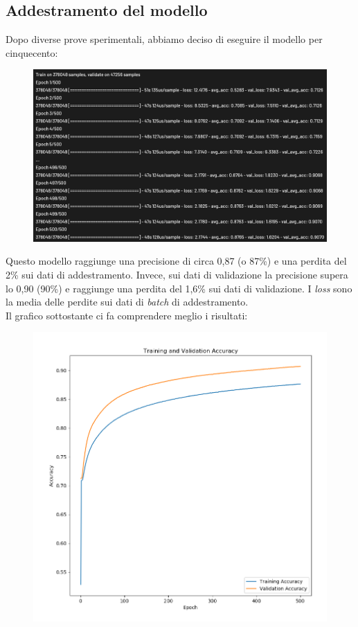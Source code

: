 \subsection{Addestramento del modello}
Dopo diverse prove sperimentali, abbiamo deciso di eseguire il modello per cinquecento:
\begin{figure}[H]
	\centering
	\includegraphics[scale=0.8]{./images/storia.png}
\end{figure}
Questo modello raggiunge una precisione di circa 0,87 (o 87\%) e una perdita del 2\% sui dati di addestramento. Invece, sui dati di validazione la precisione supera lo 0,90 (90\%) e raggiunge una perdita del 1,6\% sui dati di validazione. I \textit{loss} sono la media delle perdite sui dati di \textit{batch} di addestramento.\\
\newline
Il grafico sottostante ci fa comprendere meglio i risultati:
\begin{figure}[H]
	\centering
	\includegraphics[scale=0.35]{./images/plot.png}
\end{figure}
